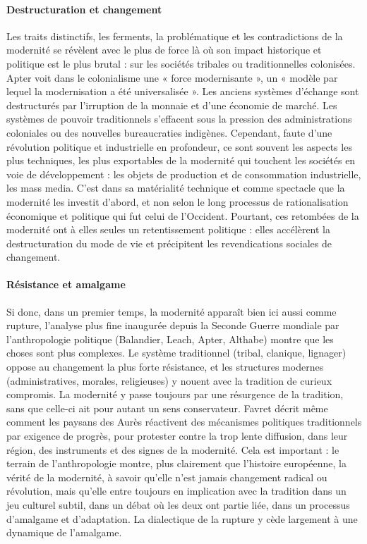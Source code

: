 \paragraph{Destructuration et changement}
Les traits distinctifs, les ferments, la problématique et les contradictions de la modernité se révèlent avec le plus de force là où son impact historique et politique est le plus brutal : sur les sociétés tribales ou traditionnelles colonisées. Apter voit dans le colonialisme une « force modernisante », un « modèle par lequel la modernisation a été universalisée ».
Les anciens systèmes d'échange sont destructurés par l'irruption de la monnaie et d'une économie de marché. Les systèmes de pouvoir traditionnels s'effacent sous la pression des administrations coloniales ou des nouvelles bureaucraties indigènes.
Cependant, faute d'une révolution politique et industrielle en profondeur, ce sont souvent les aspects les plus techniques, les plus exportables de la modernité qui touchent les sociétés en voie de développement : les objets de production et de consommation industrielle, les mass media. C'est dans sa matérialité technique et comme spectacle que la modernité les investit d'abord, et non selon le long processus de rationalisation économique et politique qui fut celui de l'Occident. Pourtant, ces retombées de la modernité ont à elles seules un retentissement politique : elles accélèrent la destructuration du mode de vie et précipitent les revendications sociales de changement.
\paragraph{Résistance et amalgame}
 
Si donc, dans un premier temps, la modernité apparaît bien ici aussi comme rupture, l'analyse plus fine inaugurée depuis la Seconde Guerre mondiale par l'anthropologie politique (Balandier, Leach, Apter, Althabe) montre que les choses sont plus complexes. Le système traditionnel (tribal, clanique, lignager) oppose au changement la plus forte résistance, et les structures modernes (administratives, morales, religieuses) y nouent avec la tradition de curieux compromis. La modernité y passe toujours par une résurgence de la tradition, sans que celle-ci ait pour autant un sens conservateur. Favret décrit même comment les paysans des Aurès réactivent des mécanismes politiques traditionnels par exigence de progrès, pour protester contre la trop lente diffusion, dans leur région, des instruments et des signes de la modernité.
Cela est important : le terrain de l'anthropologie montre, plus clairement que l'histoire européenne, la vérité de la modernité, à savoir qu'elle n'est jamais changement radical ou révolution, mais qu'elle entre toujours en implication avec la tradition dans un jeu culturel subtil, dans un débat où les deux ont partie liée, dans un processus d'amalgame et d'adaptation. La dialectique de la rupture y cède largement à une dynamique de l'amalgame.
